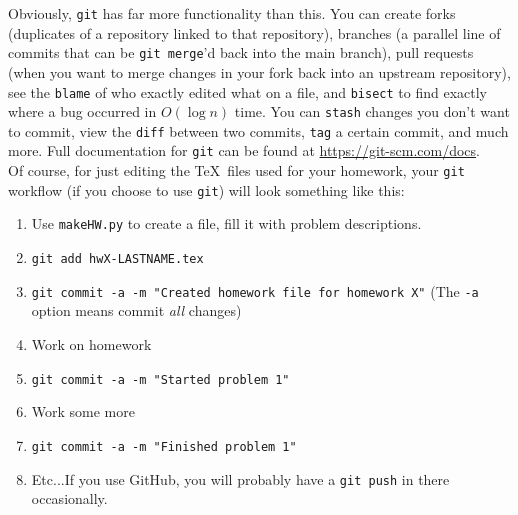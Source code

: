 \documentclass[a4paper,10pt]{article}
\begin{document}
Obviously, \texttt{git} has far more functionality than this. You can create forks (duplicates of a repository linked to that repository), branches (a parallel line of commits that can be \texttt{git merge}'d back into the main branch), pull requests (when you want to merge changes in your fork back into an upstream repository), see the \texttt{blame} of who exactly edited what on a file, and \texttt{bisect} to find exactly where a bug occurred in $O(\log n)$ time. You can \texttt{stash} changes you don't want to commit, view the \texttt{diff} between two commits, \texttt{tag} a certain commit, and much more. Full documentation for \texttt{git} can be found at \url{https://git-scm.com/docs}.
\\[10pt]
Of course, for just editing the \TeX\ files used for your homework, your \texttt{git} workflow (if you choose to use \texttt{git}) will look something like this:

\begin{enumerate}
	\item Use \texttt{makeHW.py} to create a file, fill it with problem descriptions.
	\item \texttt{git add hwX-LASTNAME.tex}
	\item \texttt{git commit -a -m "Created homework file for homework X"} (The \texttt{-a} option means commit \emph{all} changes)
	\item Work on homework
	\item \texttt{git commit -a -m "Started problem 1"}
	\item Work some more
	\item \texttt{git commit -a -m "Finished problem 1"}
	\item Etc...If you use GitHub, you will probably have a \texttt{git push} in there occasionally.
\end{enumerate}
\end{document}
